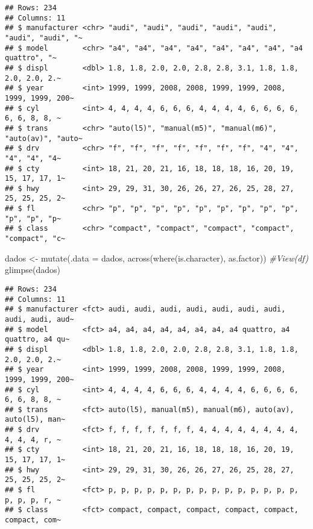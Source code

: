 \documentclass[
]{book}
\newenvironment{Shaded}{\begin{snugshade}}{\end{snugshade}}
\newcommand{\AttributeTok}[1]{\textcolor[rgb]{0.77,0.63,0.00}{#1}}
\newcommand{\CommentTok}[1]{\textcolor[rgb]{0.56,0.35,0.01}{\textit{#1}}}
\newcommand{\FunctionTok}[1]{\textcolor[rgb]{0.00,0.00,0.00}{#1}}
\newcommand{\NormalTok}[1]{#1}
\newcommand{\OtherTok}[1]{\textcolor[rgb]{0.56,0.35,0.01}{#1}}
\begin{document}
\begin{verbatim}
## Rows: 234
## Columns: 11
## $ manufacturer <chr> "audi", "audi", "audi", "audi", "audi", "audi", "audi", "~
## $ model        <chr> "a4", "a4", "a4", "a4", "a4", "a4", "a4", "a4 quattro", "~
## $ displ        <dbl> 1.8, 1.8, 2.0, 2.0, 2.8, 2.8, 3.1, 1.8, 1.8, 2.0, 2.0, 2.~
## $ year         <int> 1999, 1999, 2008, 2008, 1999, 1999, 2008, 1999, 1999, 200~
## $ cyl          <int> 4, 4, 4, 4, 6, 6, 6, 4, 4, 4, 4, 6, 6, 6, 6, 6, 6, 8, 8, ~
## $ trans        <chr> "auto(l5)", "manual(m5)", "manual(m6)", "auto(av)", "auto~
## $ drv          <chr> "f", "f", "f", "f", "f", "f", "f", "4", "4", "4", "4", "4~
## $ cty          <int> 18, 21, 20, 21, 16, 18, 18, 18, 16, 20, 19, 15, 17, 17, 1~
## $ hwy          <int> 29, 29, 31, 30, 26, 26, 27, 26, 25, 28, 27, 25, 25, 25, 2~
## $ fl           <chr> "p", "p", "p", "p", "p", "p", "p", "p", "p", "p", "p", "p~
## $ class        <chr> "compact", "compact", "compact", "compact", "compact", "c~
\end{verbatim}

\begin{Shaded}
\begin{Highlighting}[]
\NormalTok{dados }\OtherTok{\textless{}{-}} \FunctionTok{mutate}\NormalTok{(}\AttributeTok{.data =}\NormalTok{ dados, }
                \FunctionTok{across}\NormalTok{(}\FunctionTok{where}\NormalTok{(is.character), }
\NormalTok{                as.factor))}
\CommentTok{\#View(df) }
\FunctionTok{glimpse}\NormalTok{(dados)}
\end{Highlighting}
\end{Shaded}

\begin{verbatim}
## Rows: 234
## Columns: 11
## $ manufacturer <fct> audi, audi, audi, audi, audi, audi, audi, audi, audi, aud~
## $ model        <fct> a4, a4, a4, a4, a4, a4, a4, a4 quattro, a4 quattro, a4 qu~
## $ displ        <dbl> 1.8, 1.8, 2.0, 2.0, 2.8, 2.8, 3.1, 1.8, 1.8, 2.0, 2.0, 2.~
## $ year         <int> 1999, 1999, 2008, 2008, 1999, 1999, 2008, 1999, 1999, 200~
## $ cyl          <int> 4, 4, 4, 4, 6, 6, 6, 4, 4, 4, 4, 6, 6, 6, 6, 6, 6, 8, 8, ~
## $ trans        <fct> auto(l5), manual(m5), manual(m6), auto(av), auto(l5), man~
## $ drv          <fct> f, f, f, f, f, f, f, 4, 4, 4, 4, 4, 4, 4, 4, 4, 4, 4, r, ~
## $ cty          <int> 18, 21, 20, 21, 16, 18, 18, 18, 16, 20, 19, 15, 17, 17, 1~
## $ hwy          <int> 29, 29, 31, 30, 26, 26, 27, 26, 25, 28, 27, 25, 25, 25, 2~
## $ fl           <fct> p, p, p, p, p, p, p, p, p, p, p, p, p, p, p, p, p, p, r, ~
## $ class        <fct> compact, compact, compact, compact, compact, compact, com~
\end{verbatim}
\end{document}

